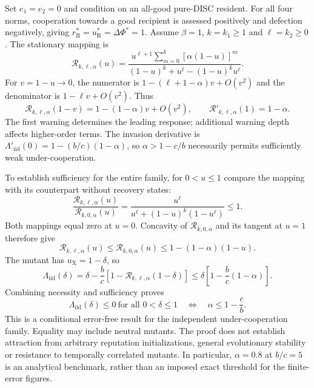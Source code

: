 \documentclass[fleqn,10pt]{wlscirep}
\begin{document}
Set $e_1=e_2=0$ and condition on an all-good pure-DISC resident. For all four norms, cooperation towards a good recipient is assessed positively and defection negatively, giving $r_{\mathrm R}^*=u_{\mathrm R}^*=\Delta\Phi^*=1$. Assume $\beta=1$, $k=k_1\geq1$ and $\ell=k_2\geq0$. The stationary mapping is
\begin{equation}
\mathcal R_{k,\ell,\alpha}(u)=
\frac{u^{\ell+1}\displaystyle\sum_{m=0}^{k}[\alpha(1-u)]^m}
{(1-u)^k+u^\ell-(1-u)^ku^\ell}.
\label{eq:si-readout-errorfree-map}
\end{equation}
For $v=1-u\to0$, the numerator is $1-(\ell+1-\alpha)v+O(v^2)$ and the denominator is $1-\ell v+O(v^2)$. Thus
\begin{equation}
\mathcal R_{k,\ell,\alpha}(1-v)
=1-(1-\alpha)v+O(v^2),\qquad
\mathcal R'_{k,\ell,\alpha}(1)=1-\alpha.
\label{eq:si-readout-first-warning}
\end{equation}
The first warning determines the leading response; additional warning depth affects higher-order terms. The invasion derivative is $\Lambda'_{\mathrm{iid}}(0)=1-(b/c)(1-\alpha)$, so $\alpha>1-c/b$ necessarily permits sufficiently weak under-cooperation.

To establish sufficiency for the entire family, for $0<u\leq1$ compare the mapping with its counterpart without recovery states:
\begin{equation}
\frac{\mathcal R_{k,\ell,\alpha}(u)}{\mathcal R_{k,0,\alpha}(u)}
=\frac{u^\ell}{u^\ell+(1-u)^k(1-u^\ell)}\leq1.
\label{eq:si-readout-recovery-bound}
\end{equation}
Both mappings equal zero at $u=0$. Concavity of $\mathcal R_{k,0,\alpha}$ and its tangent at $u=1$ therefore give
\begin{equation}
\mathcal R_{k,\ell,\alpha}(u)
\leq\mathcal R_{k,0,\alpha}(u)
\leq1-(1-\alpha)(1-u).
\label{eq:si-readout-linear-bound}
\end{equation}
The mutant has $u_{\mathrm X}=1-\delta$, so
\begin{equation}
\Lambda_{\mathrm{iid}}(\delta)
=\delta-\frac bc[1-\mathcal R_{k,\ell,\alpha}(1-\delta)]
\leq\delta\left[1-\frac bc(1-\alpha)\right].
\label{eq:si-readout-errorfree-payoff-bound}
\end{equation}
Combining necessity and sufficiency proves
\begin{equation}
\boxed{\Lambda_{\mathrm{iid}}(\delta)\leq0\ \text{for all }0<\delta\leq1
\quad\Longleftrightarrow\quad\alpha\leq1-\frac cb.}
\label{eq:si-readout-errorfree-threshold}
\end{equation}
This is a conditional error-free result for the independent under-cooperation family. Equality may include neutral mutants. The proof does not establish attraction from arbitrary reputation initializations, general evolutionary stability or resistance to temporally correlated mutants. In particular, $\alpha=0.8$ at $b/c=5$ is an analytical benchmark, rather than an imposed exact threshold for the finite-error figures.
\end{document}
